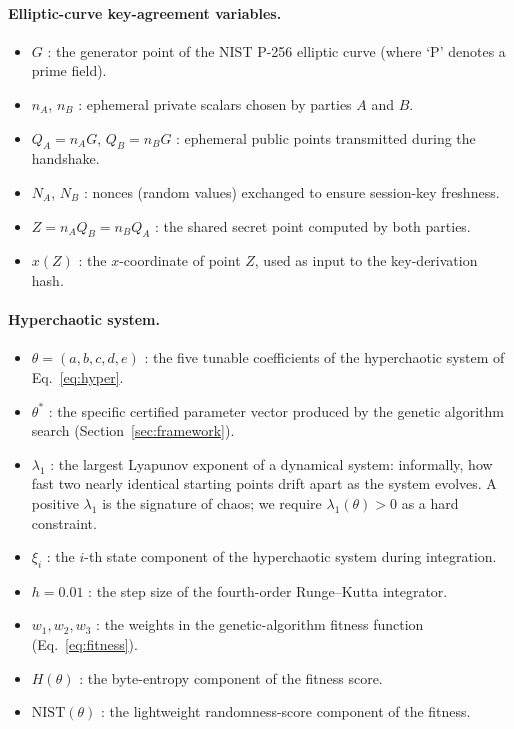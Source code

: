 \documentclass[pdflatex,sn-mathphys-num]{sn-jnl}%
\theoremstyle{thmstyleone}%
\theoremstyle{thmstyletwo}%
\theoremstyle{thmstylethree}%
\begin{document}
\paragraph{Elliptic-curve key-agreement variables.}
\begin{itemize}[leftmargin=2em]
\item $G$ : the generator point of the NIST P-256 elliptic curve (where `P' denotes a prime field).
\item $n_A$, $n_B$ : ephemeral private scalars chosen by parties $A$ and $B$.
\item $Q_A=n_A G$, $Q_B=n_B G$ : ephemeral public points transmitted during the handshake.
\item $N_A$, $N_B$ : nonces (random values) exchanged to ensure session-key freshness.
\item $Z = n_A Q_B = n_B Q_A$ : the shared secret point computed by both parties.
\item $x(Z)$ : the $x$-coordinate of point $Z$, used as input to the key-derivation hash.
\end{itemize}

\paragraph{Hyperchaotic system.}
\begin{itemize}[leftmargin=2em]
\item $\theta = (a,b,c,d,e)$ : the five tunable coefficients of the hyperchaotic system of Eq.~\eqref{eq:hyper}.
\item $\theta^\ast$ : the specific certified parameter vector produced by the genetic algorithm search (Section~\ref{sec:framework}).
\item $\lambda_1$ : the largest Lyapunov exponent of a dynamical system: informally, how fast two nearly identical starting points drift apart as the system evolves. A positive $\lambda_1$ is the signature of chaos; we require $\lambda_1(\theta)>0$ as a hard constraint.
\item $\xi_i$ : the $i$-th state component of the hyperchaotic system during integration.
\item $h=0.01$ : the step size of the fourth-order Runge--Kutta integrator.
\item $w_1,w_2,w_3$ : the weights in the genetic-algorithm fitness function (Eq.~\eqref{eq:fitness}).
\item $H(\theta)$ : the byte-entropy component of the fitness score.
\item $\mathrm{NIST}(\theta)$ : the lightweight randomness-score component of the fitness.
\end{itemize}
\end{document}
